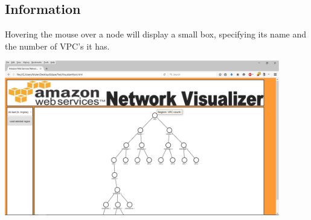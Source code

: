 \documentclass[hidelinks,a4paper,12pt]{article}
\begin{document}
		\newpage
	\subsection{Information}
	Hovering the mouse over a node will display a small box, specifying its name and the number of VPC's it has.
	
	\includegraphics[width=0.9\textwidth]{./images/Visualizer8.png}
	\newline
	
\end{document}
